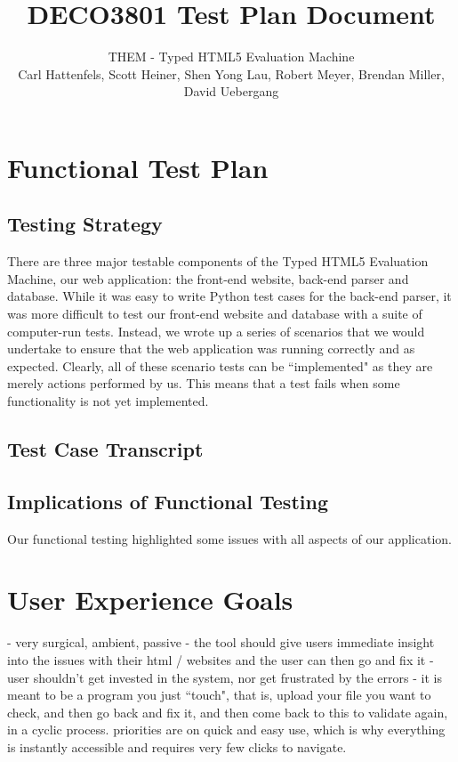 \documentclass[10pt]{article}
\title{\bf DECO3801 Test Plan Document}
\author{\normalsize THEM - Typed HTML5 Evaluation Machine \\ \normalsize Carl Hattenfels, Scott Heiner, Shen Yong Lau, Robert Meyer, Brendan Miller, David Uebergang}
\date{}
\begin{document}
\maketitle

\section*{Functional Test Plan}

\subsection*{Testing Strategy}

There are three major testable components of the Typed HTML5 Evaluation Machine, our web application: the front-end website, back-end parser and database. While it was easy to write Python test cases for the back-end parser, it was more difficult to test our front-end website and database with a suite of computer-run tests. Instead, we wrote up a series of scenarios that we would undertake to ensure that the web application was running correctly and as expected. Clearly, all of these scenario tests can be ``implemented" as they are merely actions performed by us. This means that a test fails when some functionality is not yet implemented.

\subsection*{Test Case Transcript}


\subsection*{Implications of Functional Testing}

Our functional testing highlighted some issues with all aspects of our application.


\newpage

\section*{User Experience Goals}

- very surgical, ambient, passive
- the tool should give users immediate insight into the issues with their html / websites and the user can then go and fix it
- user shouldn't get invested in the system, nor get frustrated by the errors
- it is meant to be a program you just ``touch", that is, upload your file you want to check, and then go back and fix it, and then come back to this to validate again, in a cyclic process. priorities are on quick and easy use, which is why everything is instantly accessible and requires very few clicks to navigate.
\end{document}
